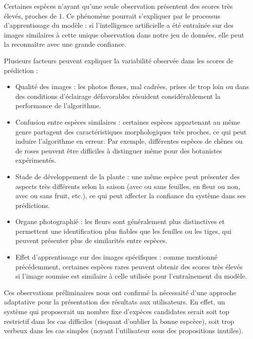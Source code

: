 \documentclass[a4paper,12pt]{article}
\begin{document}
\vspace{0.2cm}

Certaines espèces n'ayant qu'une seule observation présentent des scores très élevés, proches de $1$. Ce phénomène pourrait s'expliquer par le processus d'apprentissage du modèle : si l'intelligence artificielle a été entraînée sur des images similaires à cette unique observation dans notre jeu de données, elle peut la reconnaître avec une grande confiance.

\vspace{0.2cm}

Plusieurs facteurs peuvent expliquer la variabilité observée dans les scores de prédiction : 
\begin{itemize}
    \item Qualité des images : les photos floues, mal cadrées, prises de trop loin ou dans des conditions d'éclairage défavorables résuident considérablement la performance de l'algorithme.
    \item Confusion entre espèces similaires : certaines espèces appartenant au même genre partagent des caractéristiques morphologiques très proches, ce qui peut induire l'algorithme en erreur. Par exemple, différentes espèces de chênes ou de roses peuvent être difficiles à distinguer même pour des botanistes expérimentés.
    \item Stade de développement de la plante : une même espèce peut présenter des aspects très différents selon la saison (avec ou sans feuilles, en fleur ou non, avec ou sans fruit, etc.), ce qui peut affecter la confiance du système dans ses prédictions.
    \item Organe photographié : les fleurs sont généralement plus distinctives et permettent une identification plus fiables que les feuilles ou les tiges, qui peuvent présenter plus de similarités entre espèces.
    \item Effet d'apprentissage sur des images spécifiques : comme mentionné précédemment, certaines espèces rares peuvent obtenir des scores très élevés si l'image soumise est similaire à celle utilisée pour l'entraînement du modèle.
\end{itemize}

\vspace{0.2cm}

Ces observations préliminaires nous ont confirmé la nécessaité d'une approche adaptative pour la présentation des résultats aux utilisateurs. En effet, un système qui proposerait un nombre fixe d'expèces candidates serait soit top restrictif dans les cas difficiles (risquant d'oublier la bonne espcèce), soit trop verbeux dans les cas simples (noyant l'utilisateur sous des propositions inutiles).
\end{document}
